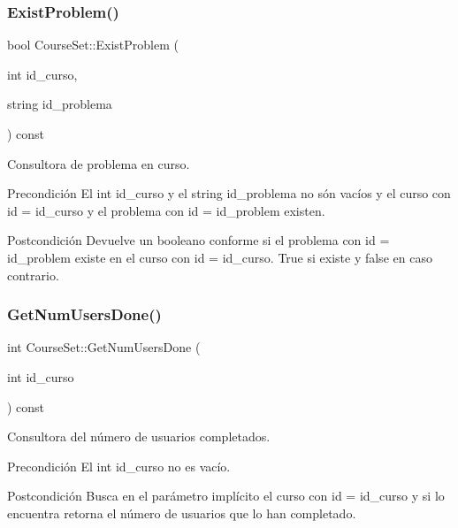 \subsubsection{\texorpdfstring{Exist\+Problem()}{ExistProblem()}}
{\footnotesize\ttfamily bool Course\+Set\+::\+Exist\+Problem (\begin{DoxyParamCaption}\item[{int}]{id\+\_\+curso,  }\item[{string}]{id\+\_\+problema }\end{DoxyParamCaption}) const}



Consultora de problema en curso. 

\begin{DoxyPrecond}{Precondición}
El int id\+\_\+curso y el string id\+\_\+problema no són vacíos y el curso con id = id\+\_\+curso y el problema con id = id\+\_\+problem existen. 
\end{DoxyPrecond}
\begin{DoxyPostcond}{Postcondición}
Devuelve un booleano conforme si el problema con id = id\+\_\+problem existe en el curso con id = id\+\_\+curso. True si existe y false en caso contrario. 
\end{DoxyPostcond}
\mbox{\label{class_course_set_a46150057534a76182941f23beb2ce4cc}} 
\subsubsection{\texorpdfstring{Get\+Num\+Users\+Done()}{GetNumUsersDone()}}
{\footnotesize\ttfamily int Course\+Set\+::\+Get\+Num\+Users\+Done (\begin{DoxyParamCaption}\item[{int}]{id\+\_\+curso }\end{DoxyParamCaption}) const}



Consultora del número de usuarios completados. 

\begin{DoxyPrecond}{Precondición}
El int id\+\_\+curso no es vacío. 
\end{DoxyPrecond}
\begin{DoxyPostcond}{Postcondición}
Busca en el parámetro implícito el curso con id = id\+\_\+curso y si lo encuentra retorna el número de usuarios que lo han completado. 
\end{DoxyPostcond}
\mbox{\label{class_course_set_a72b6a09b4eafce672b57abebfa9f1f55}} 
